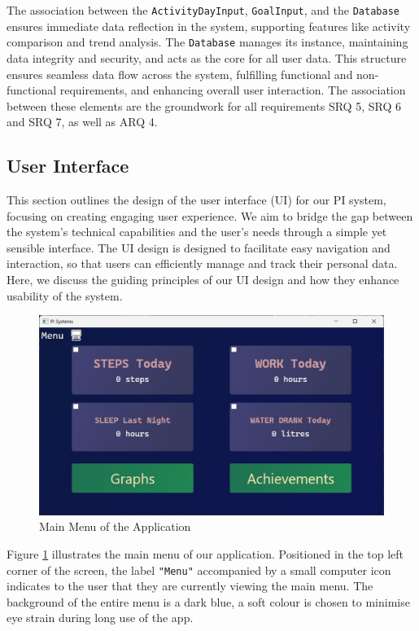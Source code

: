 \documentclass[11pt]{article}
\begin{document}
The association between the \texttt{ActivityDayInput}, \texttt{GoalInput}, and the \texttt{Database}
ensures immediate data reflection in the system, supporting features like
activity comparison and trend analysis. The \texttt{Database} manages its instance,
maintaining data integrity and security, and acts as the core
for all user data. This structure ensures seamless data flow across the system,
fulfilling functional and non-functional requirements, and enhancing overall
user interaction. The association between these elements are the groundwork for all requirements SRQ 5, SRQ 6 and SRQ 7, as well as ARQ 4.\par

\newpage

\subsection{User Interface}

This section outlines the design of the user interface (UI) for our PI system,
focusing on creating engaging user experience. We aim to bridge
the gap between the system's technical capabilities and the user's needs through
a simple yet sensible interface. The UI design is designed to facilitate easy
navigation and interaction, so that users can efficiently manage and track
their personal data. Here, we discuss the guiding principles of our UI design and
how they enhance usability of the system.\par

\begin{figure}[!ht]
  \centering
  \includegraphics[width = 0.5\linewidth]{Main Menu}
  \caption{Main Menu of the Application}
  \label{fig:Menu}
\end{figure}

Figure \ref{fig:Menu} illustrates the main menu of our application. Positioned in the top left
corner of the screen, the label \texttt{"Menu"} accompanied by a small computer icon indicates
to the user that they are currently viewing the main menu. The background of the 
entire menu is a dark blue, a soft colour is chosen to minimise eye strain during 
long use of the app.\par
\end{document}
